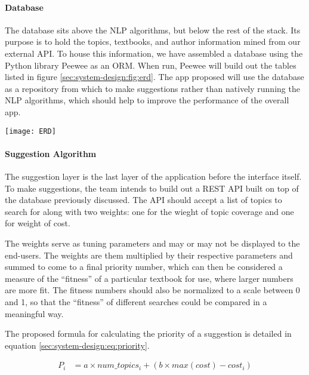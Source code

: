 \paragraph{Database}
The database sits above the NLP algorithms, but below the rest of the
stack.
Its purpose is to hold the topics, textbooks, and author information
mined from our external API.  
To house this information, we have assembled a database using the
Python library Peewee as an ORM.
When run, Peewee will build out the tables listed in figure \ref{sec:system-design:fig:erd}.
The app proposed will use the database as a repository from which to
make suggestions rather than natively running the NLP algorithms,
which should help to improve the performance of the overall app.

\begin{figure*}[h]
\label{sec:system-design:fig:erd}
\caption{ERD of Proposed Database}
\centering
\texttt{[image: ERD]}
\end{figure*}

\paragraph{Suggestion Algorithm}
The suggestion layer is the last layer of the application before the
interface itself.
To make suggestions, the team intends to build out a REST API built on
top of the database previously discussed.
The API should accept a list of topics to search for along with two
weights: one for the wieght of topic coverage and one for weight of
cost.

The weights serve as tuning parameters and may or may not be displayed
to the end-users.
The weights are them multiplied by their respective parameters and
summed to come to a final priority number, which can then be
considered a measure of the ``fitness'' of a particular textbook for
use, where larger numbers are more fit.
The fitness numbers should also be normalized to a scale between 0 and
1, so that the ``fitness'' of different searches could be compared in
a meaningful way.

The proposed formula for calculating the priority of a suggestion is
detailed in equation \ref{sec:system-design:eq:priority}.


\begin{align}
P_i &= a \times num\_topics_i + (b \times max(cost) - cost_i) \label{sec:system-design:eq:priority}
\end{align}

